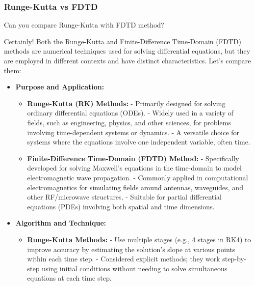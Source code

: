 \subsubsection{Runge-Kutta vs FDTD}

\begin{ai}
Can you compare Runge-Kutta with FDTD method?
\end{ai}

\begin{airesult}
Certainly! Both the Runge-Kutta and Finite-Difference Time-Domain (FDTD) methods are numerical
techniques used for solving differential equations, but they are employed in different contexts and
have distinct characteristics. Let's compare them:

\vsp

\begin{itemize}
\item \textbf{Purpose and Application:}

  \begin{itemize}
  \item \textbf{Runge-Kutta (RK) Methods:}
    - Primarily designed for solving ordinary differential equations (ODEs).
    - Widely used in a variety of fields, such as engineering, physics, and other sciences, for
problems involving time-dependent systems or dynamics.
    - A versatile choice for systems where the equations involve one independent variable, often
time.

  \item \textbf{Finite-Difference Time-Domain (FDTD) Method:}
    - Specifically developed for solving Maxwell's equations in the time-domain to model
electromagnetic wave propagation.
    - Commonly applied in computational electromagnetics for simulating fields around antennas,
waveguides, and other RF/microwave structures.
    - Suitable for partial differential equations (PDEs) involving both spatial and time dimensions.

  \end{itemize}

\item \textbf{Algorithm and Technique:}

  \begin{itemize}
  \item \textbf{Runge-Kutta Methods:}
    - Use multiple stages (e.g., 4 stages in RK4) to improve accuracy by estimating the solution's
slope at various points within each time step.
    - Considered explicit methods; they work step-by-step using initial conditions without needing
to solve simultaneous equations at each time step.


\end{itemize}
\end{itemize}
\end{airesult}
